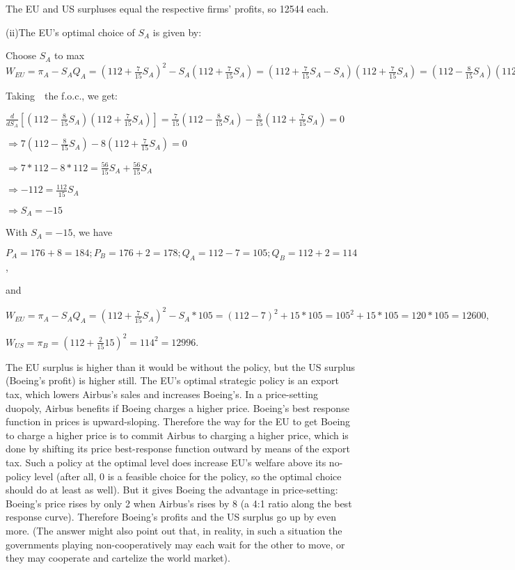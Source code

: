 \begin{enumerate}
	The EU and US surpluses equal the respective firms' profits, so 12544 each.

	\bigskip

	(ii)The EU's optimal choice of  $S_{A}$ is given by:

	Choose $S_{A}$ to max $W_{EU}=\pi _{A}-S_{A}Q_{A}=(112+\frac{7}{15}%
	S_{A})^{2}-S_{A}(112+\frac{7}{15}S_{A})=(112+\frac{7}{15}S_{A}-S_{A})(112+%
	\frac{7}{15}S_{A})=(112-\frac{8}{15}S_{A})(112+\frac{7}{15}S_{A})$ 

	Taking\  \ the f.o.c., we get:

	$\frac{d}{dS_{A}}[(112-\frac{8}{15}S_{A})(112+\frac{7}{15}S_{A})]=\frac{7}{15%
	}(112-\frac{8}{15}S_{A})-\frac{8}{15}(112+\frac{7}{15}S_{A})=0$

	$\Longrightarrow 7(112-\frac{8}{15}S_{A})-8(112+\frac{7}{15}S_{A})=0$

	$\Longrightarrow 7\ast 112-8\ast 112=\frac{56}{15}S_{A}+\frac{56}{15}S_{A}$

	$\Longrightarrow -112=\frac{112}{15}S_{A}$

	$\Longrightarrow S_{A}=-15$

	With $S_{A}=-15$, we have

	$P_{A}=176+8=184;P_{B}=176+2=178;Q_{A}=112-7=105;Q_{B}=112+2=114$,

	and

	$W_{EU}=\pi _{A}-S_{A}Q_{A}=(112+\frac{7}{15}S_{A})^{2}-S_{A}\ast
	105=(112-7)^{2}+15\ast 105=105^{2}+15\ast 105=120\ast 105=12600,$

	$W_{US}=\pi _{B}=(112+\frac{2}{15}15)^{2}=114^{2}=12996.$

	The EU surplus is higher than it would be without the policy, but the US surplus (Boeing's profit) is higher still. The EU's optimal strategic policy is an export tax, which lowers Airbus's sales and increases Boeing's. In a price-setting duopoly, Airbus benefits if Boeing charges a higher price. Boeing's best response function in prices is upward-sloping. Therefore the way for the EU to get Boeing to charge a higher price is to commit Airbus to charging a higher price, which is done by shifting its price best-response function outward by means of the export tax. Such a policy at the optimal level does increase EU's welfare above its no-policy level (after all, 0 is a feasible choice for the policy, so the optimal choice should do at least as well). But it gives Boeing the advantage in price-setting: Boeing's price rises by only 2 when Airbus's rises by 8 (a 4:1 ratio along the best response curve). Therefore Boeing's profits and the US surplus go up by even more. (The answer might also point out that, in reality, in such a situation the governments playing non-cooperatively may each wait for the other to move, or they may cooperate and cartelize the world market).


\end{enumerate}
